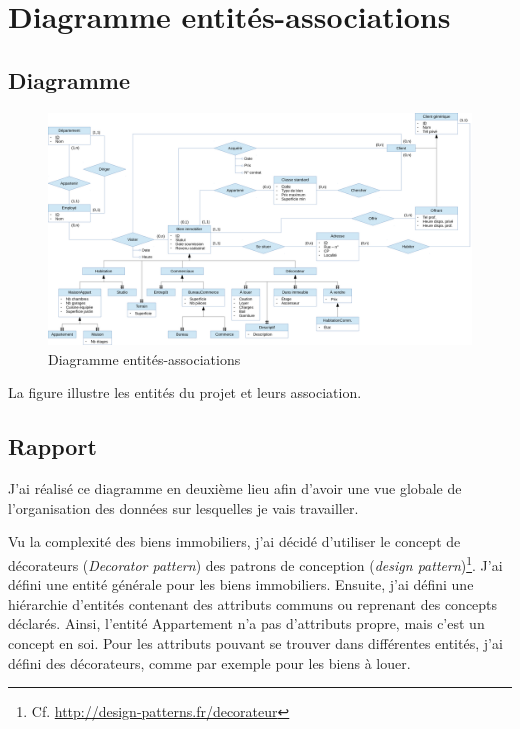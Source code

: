 \chapter{Diagramme entités-associations}

\section{Diagramme}

\begin{figure}
  \centering
  \includegraphics[angle=90,height=0.95\textheight]{IMG/er}
  \caption{Diagramme entités-associations}
  \label{img_er}
\end{figure}

La figure  illustre les entités du projet et leurs association.

\section{Rapport}

J'ai réalisé ce diagramme en deuxième lieu afin d'avoir une vue globale de l'organisation des données sur lesquelles je vais travailler.

Vu la complexité des biens immobiliers, j'ai décidé d'utiliser le concept de décorateurs (\emph{Decorator pattern}) des patrons de conception (\emph{design pattern})\footnote{Cf. \url{http://design-patterns.fr/decorateur}}. J'ai défini une entité générale pour les biens immobiliers. Ensuite, j'ai défini une hiérarchie d'entités contenant des attributs communs ou reprenant des concepts déclarés. Ainsi, l'entité \og{}Appartement\fg{} n'a pas d'attributs propre, mais c'est un concept en soi. Pour les attributs pouvant se trouver dans différentes entités, j'ai défini des décorateurs, comme par exemple pour les biens à louer.

